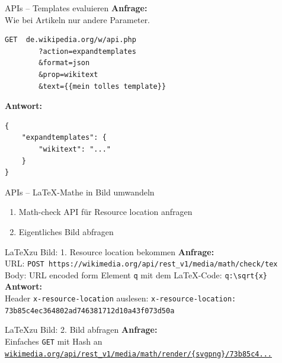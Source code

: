 \documentclass[9pt]{beamer}
\begin{document}
	\begin{frame}[fragile]{APIs -- Templates evaluieren}
		\textbf{Anfrage:}\\
		Wie bei Artikeln nur andere Parameter.\\
		\begin{verbatim}
GET  de.wikipedia.org/w/api.php
        ?action=expandtemplates
        &format=json
        &prop=wikitext
        &text={{mein tolles template}}
		\end{verbatim}\n
		\textbf{Antwort:}
		\begin{verbatim}
{
    "expandtemplates": {
        "wikitext": "..."
    }
}
		\end{verbatim}
	\end{frame}

	\begin{frame}{APIs -- \LaTeX-Mathe in Bild umwandeln}
		\begin{enumerate}
			\item Math-check API für Resource location anfragen
			\item Eigentliches Bild abfragen
		\end{enumerate}
	\end{frame}

	\begin{frame}[fragile]{\LaTeX zu Bild: 1. Resource location bekommen}
		\textbf{Anfrage:}\\
		URL: \texttt{POST https://wikimedia.org/api/rest\_v1/media/math/check/tex}\\
		Body: URL encoded form Element \texttt{q} mit dem \LaTeX-Code:\n
		\verb+q:\sqrt{x}+
		\n
		\textbf{Antwort:}\\
		Header \texttt{x-resource-location} auslesen:\n
		\texttt{x-resource-location: 73b85c4ec364802ad746381712d10a43f073d50a}
	\end{frame}

	\begin{frame}[fragile]{\LaTeX zu Bild: 2. Bild abfragen}
		\textbf{Anfrage:}\\
		Einfaches \texttt{GET} mit Hash an\n
		\href{https://wikimedia.org/api/rest_v1/media/math/render/svg/73b85c4ec364802ad746381712d10a43f073d50a}{\texttt{wikimedia.org/api/rest\_v1/media/math/render/\{svg\textbar png\}/73b85c4...}}
	\end{frame}
		
\end{document}
